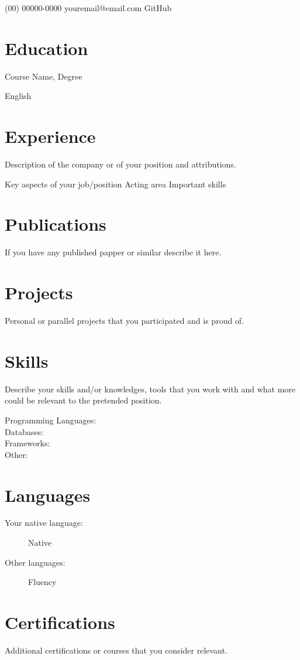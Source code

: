 \documentclass{cv-template}
\begin{document}
\address{Neighborhood -- City}
\contact
    {(00) 00000-0000}
    {youremail@email.com}
    {GitHub}


\section{Education}

Course Name, Degree

English


\section{Experience}

Description of the company or of your position and attributions.

\workitems
    {Key aspects of your job/position}
    {Acting area}
    {Important skills}


\section{Publications}

If you have any published papper or similar describe it here.

\section{Projects}

Personal or parallel projects that you participated and is proud of.

\section{Skills}

Describe your skills and/or knowledges, tools that you work with and
what more could be relevant to the pretended position.

\begin{description}
    \item [Programming Languages:]
    \item [Databases:]
    \item [Frameworks:]
    \item [Other:]
\end{description}


\section{Languages}

\begin{description}
    \item [Your native language:] Native
    \item [Other languages:] Fluency
\end{description}


\section{Certifications}
Additional certifications or courses that you consider relevant.
\end{document}
